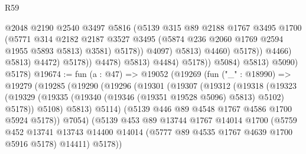 \begin{lexlean}{R59}
\begin{coremodule}
                                            @2048
                                            @2190
                                            @2540
                                            @3497
                                            @5816
                                            (@5139
                                              @315
                                              @89
                                              @2188
                                              @1767
                                              @3495
                                              @1700
                                              (@5771
                                                @314
                                                @2182
                                                @2187
                                                @3527
                                                @3495
                                                (@5874 @236 @2060 @1769 @2594 @1955 @5893 @5813)
                                                @3581)
                                              @5178))
                                          @4097)
                                        @5813)
                                      @4460)
                                    @5178))
                                @4466)
                              @5813)
                            @4472)
                          @5178))
                      @4478)
                    @5813)
                  @4484)
                @5178))
            @5084)
          @5813)
        @5090)
      @5178)
@19674 := fun (a : @47) =>
  @19052
    (@19269
      (fun ("_" : @18990) =>
      @19279
        (@19285
          (@19290
            (@19296
              (@19301
                (@19307
                  (@19312
                    (@19318
                      (@19323
                        (@19329 (@19335 (@19340 (@19346 (@19351 @19528 @5096) @5813) @5102) @5178))
                        @5108)
                      @5813)
                    @5114)
                  (@5139 @446 @89 @4548 @1767 @4586 @1700 @5924 @5178))
                @7054)
              (@5139
                @453
                @89
                @13744
                @1767
                @14014
                @1700
                (@5759
                  @452
                  @13741
                  @13743
                  @14400
                  @14014
                  (@5777 @89 @4535 @1767 @4639 @1700 @5916 @5178)
                  @14411)
                @5178))

\end{coremodule}
\end{lexlean}

